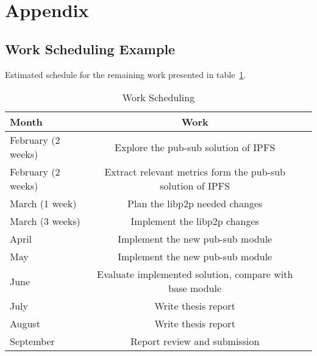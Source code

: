 
\section{Appendix} %
\label{sec:attachments}

\subsection{Work Scheduling Example} %
\label{sub:work_scheduling}
Estimated schedule for the remaining work presented in table~\ref{tab:worktable}.
\begin{table}[H]
  \caption{Work Scheduling}
  \label{tab:worktable}
  \begin{center}
    \begin{tabular}{l|cc}
    \hline

    \hline
    \textbf{Month} & \textbf{Work} \\
    \hline
      February (2 weeks) & Explore the pub-sub solution of IPFS \\
    \hline
      February (2 weeks) & Extract relevant metrics form the pub-sub solution of IPFS \\
    \hline
      March (1 week) & Plan the libp2p needed changes \\
    \hline
      March (3 weeks) & Implement the libp2p changes \\
    \hline
      April & Implement the new pub-sub module \\
    \hline
      May & Implement the new pub-sub module \\
    \hline
      June & Evaluate implemented solution, compare with base module \\
    \hline
      July & Write thesis report   \\
    \hline
      August & Write thesis report   \\
    \hline
      September & Report review and submission   \\
    \hline

    \hline
    \end{tabular}
  \end{center}
\end{table}
